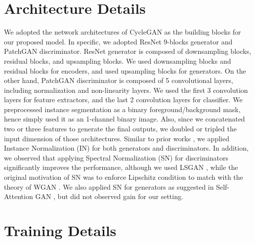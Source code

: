 \documentclass{article} \usepackage{iclr2019_conference,times}
\begin{document}
\section{Architecture Details}
\label{sec:architecture-details}
We adopted the network architectures of CycleGAN \citep{zhu2017unpaired} as the building blocks for our proposed model.
In specific, we adopted ResNet $9$-blocks generator \citep{johnson2016perceptual, he2016deep} and PatchGAN \citep{isola2017image} discriminator.
ResNet generator is composed of downsampling blocks, residual blocks, and upsampling blocks.
We used downsampling blocks and residual blocks for encoders, and used upsampling blocks for generators.
On the other hand, PatchGAN discriminator is composed of 5 convolutional layers, including normalization and non-linearity layers.
We used the first 3 convolution layers for feature extractors, and the last 2 convolution layers for classifier.
We preprocessed instance segmentation as a binary foreground/background mask, hence simply used it as an 1-channel binary image.
Also, since we concatenated two or three features to generate the final outputs, we doubled or tripled the input dimension of those architectures.
Similar to prior works \citep{johnson2016perceptual, zhu2017unpaired},
we applied Instance Normalization (IN) \citep{ulyanov2016instance} for both generators and discriminators.
In addition, we observed that applying Spectral Normalization (SN) \citep{miyato2018spectral}
for discriminators significantly improves the performance, although we used LSGAN \citep{mao2017least},
while the original motivation of SN was to enforce Lipschitz condition to match with the theory of WGAN \citep{arjovsky2017wasserstein, gulrajani2017improved}.
We also applied SN for generators as suggested in Self-Attention GAN \citep{zhang2018self}, but did not observed gain for our setting.


\section{Training Details}
\label{sec:training-details}
\end{document}
